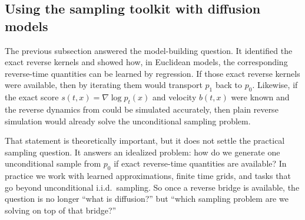 \subsection{Using the sampling toolkit with diffusion models}
\label{subsec:diffusion-sampling-viewpoints}

The previous subsection answered the model-building question.
It identified the exact reverse kernels and showed how, in Euclidean models, the corresponding reverse-time quantities can be learned by regression.
If those exact reverse kernels were available, then by  iterating them would transport \(p_1\) back to \(p_0\).
Likewise, if the exact score \(s(t,x)=\nabla\log p_t(x)\) and velocity \(b(t,x)\) were known and the reverse dynamics from  could be simulated accurately, then plain reverse simulation would already solve the unconditional sampling problem.

That statement is theoretically important, but it does not settle the practical sampling question.
It answers an idealized problem:
how do we generate one unconditional sample from \(p_0\) if exact reverse-time quantities are available?
In practice we work with learned approximations, finite time grids, and tasks that go beyond unconditional i.i.d.\ sampling.
So once a reverse bridge is available, the question is no longer ``what is diffusion?'' but ``which sampling problem are we solving on top of that bridge?''

